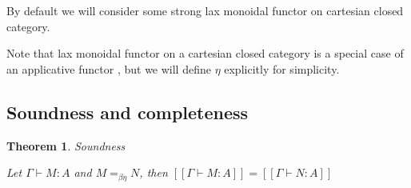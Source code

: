 \documentclass[a4paper]{article}
\newtheorem{theorem}{Theorem}
\begin{document}
By default we will consider some strong lax monoidal functor on cartesian closed category.

Note that lax monoidal functor on a cartesian closed category is a special case of an applicative functor \cite{Cons}, but
we will define $\eta$ explicitly for simplicity.

\subsection{Soundness and completeness}

\begin{theorem} Soundness

  Let $\Gamma \vdash M : A$ and $M =_{\beta\eta} N$, then $[\![\Gamma \vdash M : A]\!] = [\![\Gamma \vdash N : A]\!]$
\end{theorem}
\end{document}
